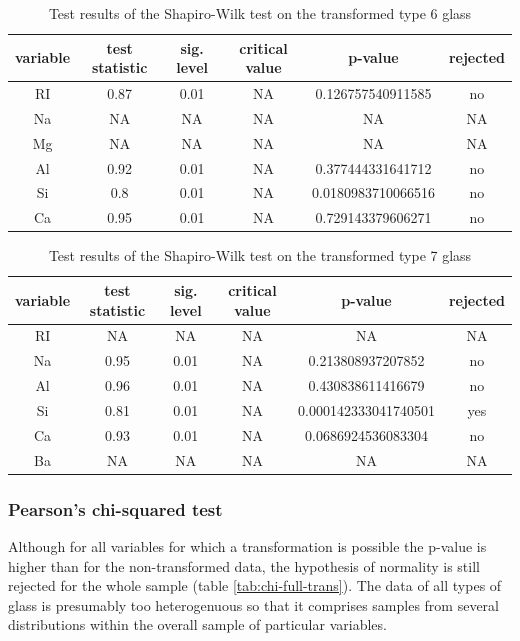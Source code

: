 \documentclass[a4paper, 12pt, titlepage, headsepline, listof = totoc, bibliography = totoc, numbers = noenddot]{scrartcl}
\begin{document}
\begin{table}[h!]
\centering
\begin{tabular}{|cccccc|} \hline variable & test statistic & sig. level & critical value & p-value & rejected\\ \hline RI & 0.87 & 0.01 & NA & 0.126757540911585 & no\\ 
Na & NA & NA & NA & NA & NA\\ 
Mg & NA & NA & NA & NA & NA\\ 
Al & 0.92 & 0.01 & NA & 0.377444331641712 & no\\ 
Si & 0.8 & 0.01 & NA & 0.0180983710066516 & no\\ 
Ca & 0.95 & 0.01 & NA & 0.729143379606271 & no\\ \hline \end{tabular}\caption{Test results of the Shapiro-Wilk test on the transformed type 6 glass}
\label{tab:testrestype6SWtrans}
\end{table}

\begin{table}[h!]
\centering
\begin{tabular}{|cccccc|} \hline variable & test statistic & sig. level & critical value & p-value & rejected\\ \hline RI & NA & NA & NA & NA & NA\\ 
Na & 0.95 & 0.01 & NA & 0.213808937207852 & no\\ 
Al & 0.96 & 0.01 & NA & 0.430838611416679 & no\\ 
Si & 0.81 & 0.01 & NA & 0.000142333041740501 & yes\\ 
Ca & 0.93 & 0.01 & NA & 0.0686924536083304 & no\\ 
Ba & NA & NA & NA & NA & NA\\ \hline \end{tabular}\caption{Test results of the Shapiro-Wilk test on the transformed type 7 glass}
\label{tab:testrestype7SWtrans}
\end{table}


\subsubsection{Pearson's chi-squared test}
Although for all variables for which a transformation is possible the p-value is higher than for the non-transformed data, the hypothesis of normality is still rejected for the whole sample (table \ref{tab:chi-full-trans}). The data of all types of glass is presumably too heterogenuous so that it comprises samples from several distributions within the overall sample of particular variables.
\end{document}
